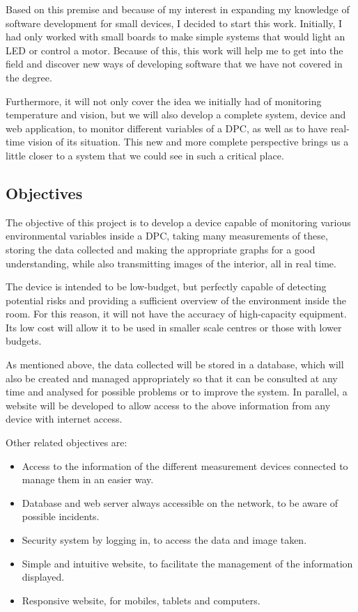 Based on this premise and because of my interest in expanding my knowledge of software development for small devices, I decided to start this work. Initially, I had only worked with small boards to make simple systems that would light an LED or control a motor. Because of this, this work will help me to get into the field and discover new ways of developing software that we have not covered in the degree.
\pagebreak

Furthermore, it will not only cover the idea we initially had of monitoring temperature and vision, but we will also develop a complete system, device and web application, to monitor different variables of a DPC, as well as to have real-time vision of its situation. This new and more complete perspective brings us a little closer to a system that we could see in such a critical place.

\subsection{Objectives}\label{subsec:objectives}
The objective of this project is to develop a device capable of monitoring various environmental variables inside a DPC, taking many measurements of these, storing the data collected and making the appropriate graphs for a good understanding, while also transmitting images of the interior, all in real time.

The device is intended to be low-budget, but perfectly capable of detecting potential risks and providing a sufficient overview of the environment inside the room. For this reason, it will not have the accuracy of high-capacity equipment. Its low cost will allow it to be used in smaller scale centres or those with lower budgets.

As mentioned above, the data collected will be stored in a database, which will also be created and managed appropriately so that it can be consulted at any time and analysed for possible problems or to improve the system. In parallel, a website will be developed to allow access to the above information from any device with internet access.

Other related objectives are:
\begin{itemize}
	\item Access to the information of the different measurement devices connected to manage them in an easier way.
	\item Database and web server always accessible on the network, to be aware of possible incidents.
	\item Security system by logging in, to access the data and image taken.
	\item Simple and intuitive website, to facilitate the management of the information displayed.
	\item Responsive website, for mobiles, tablets and computers.
\end{itemize}

